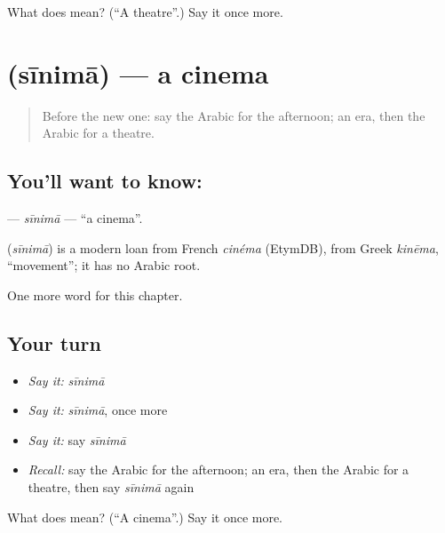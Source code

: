 \begin{tcolorbox}[breakable,colback=teal!4,colframe=teal!35!black,title={Before you move on}]
What does  mean? (\textquotedblleft{}A theatre\textquotedblright{}.) Say it once more.
\end{tcolorbox}
\section[\texorpdfstring{\ar{سينما} (sīnimā)}{سينما (sīnimā)}]{ (sīnimā) — a cinema}

\label{lesson:AR-C265-sinima}



\begin{quote}
Before the new one: say the Arabic for the afternoon; an era, then the Arabic for a theatre.
\end{quote}

\subsection*{You'll want to know: }
\textbf{} — \emph{sīnimā} — \textquotedblleft{}a cinema\textquotedblright{}.

\begin{cousinweb}
\textbf{} (\emph{sīnimā}) is a modern loan from French \emph{cinéma} (EtymDB), from Greek \emph{kinēma}, \textquotedblleft{}movement\textquotedblright{}; it has no Arabic root.
\end{cousinweb}

\begin{grammarlens}[title={What you've built}]
One more word for this chapter.
\end{grammarlens}

\subsection*{Your turn}
\begin{itemize}
\raggedright
  \item \emph{Say it:} \emph{sīnimā}
  \item \emph{Say it:} \emph{sīnimā}, once more
  \item \emph{Say it:} say \emph{sīnimā}
  \item \emph{Recall:} say the Arabic for the afternoon; an era, then the Arabic for a theatre, then say \emph{sīnimā} again
\end{itemize}

\begin{tcolorbox}[breakable,colback=teal!4,colframe=teal!35!black,title={Before you move on}]
What does  mean? (\textquotedblleft{}A cinema\textquotedblright{}.) Say it once more.
\end{tcolorbox}

